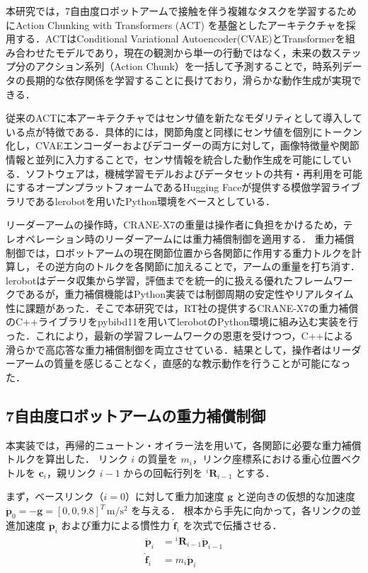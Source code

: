 本研究では，7自由度ロボットアームで接触を伴う複雑なタスクを学習するためにAction Chunking with Transformers (ACT) \cite{zhaoLearningFineGrainedBimanual2023}を基盤としたアーキテクチャを採用する．ACTはConditional Variational Autoencoder(CVAE)とTransformerを組み合わせたモデルであり，現在の観測から単一の行動ではなく，未来の数ステップ分のアクション系列（Action Chunk）を一括して予測することで，時系列データの長期的な依存関係を学習することに長けており，滑らかな動作生成が実現できる．\par
従来のACTに本アーキテクチャではセンサ値を新たなモダリティとして導入している点が特徴である．具体的には，関節角度と同様にセンサ値を個別にトークン化し，CVAEエンコーダーおよびデコーダーの両方に対して，画像特徴量や関節情報と並列に入力することで，センサ情報を統合した動作生成を可能にしている．ソフトウェアは，機械学習モデルおよびデータセットの共有・再利用を可能にするオープンプラットフォームであるHugging Faceが提供する模倣学習ライブラリであるlerobot\cite{cadene2024lerobot}を用いたPython環境をベースとしている．\par
リーダーアームの操作時，CRANE-X7の重量は操作者に負担をかけるため，テレオペレーション時のリーダーアームには重力補償制御を適用する．
重力補償制御では，ロボットアームの現在関節位置から各関節に作用する重力トルクを計算し，その逆方向のトルクを各関節に加えることで，アームの重量を打ち消す．lerobotはデータ収集から学習，評価までを統一的に扱える優れたフレームワークであるが，重力補償機能はPython実装では制御周期の安定性やリアルタイム性に課題があった．そこで本研究では，RT社の提供するCRANE-X7の重力補償のC++ライブラリをpybibd11を用いてlerobotのPython環境に組み込む実装を行った．これにより，最新の学習フレームワークの恩恵を受けつつ，C++による滑らかで高応答な重力補償制御を両立させている．結果として，操作者はリーダーアームの質量を感じることなく，直感的な教示動作を行うことが可能になった．

\subsection{7自由度ロボットアームの重力補償制御}

本実装では，再帰的ニュートン・オイラー法を用いて，各関節に必要な重力補償トルクを算出した．
リンク $i$ の質量を $m_i$，リンク座標系における重心位置ベクトルを $\boldsymbol{c}_i$，親リンク $i-1$ からの回転行列を ${}^i\boldsymbol{R}_{i-1}$ とする．

まず，ベースリンク（$i=0$）に対して重力加速度 $\boldsymbol{g}$ と逆向きの仮想的な加速度 $\ddot{\boldsymbol{p}}_0 = -\boldsymbol{g} = [0, 0, 9.8]^T \, \mathrm{m/s^2}$ を与える．
根本から手先に向かって，各リンクの並進加速度 $\ddot{\boldsymbol{p}}_i$ および重力による慣性力 $\hat{\boldsymbol{f}}_i$ を次式で伝播させる．
\begin{align}
    \ddot{\boldsymbol{p}}_i &= {}^i\boldsymbol{R}_{i-1} \ddot{\boldsymbol{p}}_{i-1} \\
    \hat{\boldsymbol{f}}_i &= m_i \ddot{\boldsymbol{p}}_i
\end{align}

